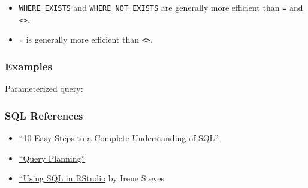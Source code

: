 \documentclass[
]{book}
\newenvironment{Shaded}{\begin{snugshade}}{\end{snugshade}}
\newcommand{\CommentTok}[1]{\textcolor[rgb]{0.56,0.35,0.01}{\textit{#1}}}
\newcommand{\ControlFlowTok}[1]{\textcolor[rgb]{0.13,0.29,0.53}{\textbf{#1}}}
\newcommand{\FunctionTok}[1]{\textcolor[rgb]{0.00,0.00,0.00}{#1}}
\newcommand{\NormalTok}[1]{#1}
\newcommand{\OtherTok}[1]{\textcolor[rgb]{0.56,0.35,0.01}{#1}}
\newcommand{\SpecialCharTok}[1]{\textcolor[rgb]{0.00,0.00,0.00}{#1}}
\newcommand{\StringTok}[1]{\textcolor[rgb]{0.31,0.60,0.02}{#1}}
\providecommand{\tightlist}{%
  \setlength{\itemsep}{0pt}\setlength{\parskip}{0pt}}
\begin{document}
\begin{itemize}
  \begin{itemize}
  \tightlist
  \item
    \texttt{WHERE\ EXISTS} and \texttt{WHERE\ NOT\ EXISTS} are generally more efficient than \texttt{=} and \texttt{\textless{}\textgreater{}}.
  \item
    \texttt{=} is generally more efficient than \texttt{\textless{}\textgreater{}}.
  \end{itemize}
\end{itemize}

\hypertarget{examples-2}{%
\subsubsection{Examples}\label{examples-2}}

Parameterized query:

\begin{Shaded}
\end{Shaded}

\hypertarget{sql-references}{%
\subsubsection{SQL References}\label{sql-references}}

\begin{itemize}
\tightlist
\item
  \href{https://blog.jooq.org/2016/03/17/10-easy-steps-to-a-complete-understanding-of-sql/}{``10 Easy Steps to a Complete Understanding of SQL''}
\item
  \href{https://www.sqlite.org/queryplanner.html}{``Query Planning''}
\item
  \href{https://irene.rbind.io/post/using-sql-in-rstudio/}{``Using SQL in RStudio} by Irene Steves
\end{itemize}
\end{document}
